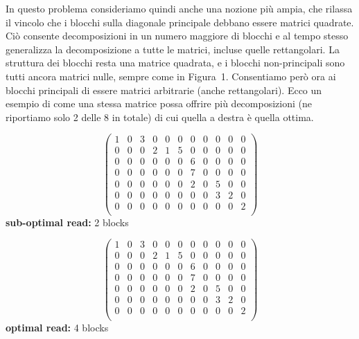 \newpage
{}

In questo problema consideriamo quindi anche una nozione più ampia, che rilassa il vincolo che i blocchi sulla diagonale principale debbano essere matrici quadrate. Ciò consente decomposizioni in un numero maggiore di blocchi e al tempo stesso generalizza la decomposizione a tutte le matrici, incluse quelle rettangolari.
La struttura dei blocchi resta una matrice quadrata, e i blocchi non-principali sono tutti ancora matrici nulle, sempre come in Figura~1. Consentiamo però ora ai blocchi principali di essere matrici arbitrarie (anche rettangolari).
Ecco un esempio di come una stessa matrice possa offrire più decomposizioni (ne riportiamo solo 2 delle 8 in totale) di cui quella a destra è quella ottima.

\begin{table}[!h]
  \begin{minipage}{.5\textwidth}
    \centering
\[
\left(
\begin{array}{cccccc|ccccc}
    1 & 0 & 3  & 0 & 0 & 0   &  0 & 0 & 0 & 0  & 0     \\
    0 & 0 & 0  & 2 & 1 & 5   &  0 & 0 & 0 & 0  & 0     \\   \hline
    0 & 0 & 0  & 0 & 0 & 0   &  6 & 0 & 0 & 0  & 0     \\
    0 & 0 & 0  & 0 & 0 & 0   &  7 & 0 & 0 & 0  & 0     \\
    0 & 0 & 0  & 0 & 0 & 0   &  2 & 0 & 5 & 0  & 0     \\
    0 & 0 & 0  & 0 & 0 & 0   &  0 & 0 & 3 & 2  & 0     \\
    0 & 0 & 0  & 0 & 0 & 0   &  0 & 0 & 0 & 0  & 2     \\
\end{array}\right)
\]
    {\bf sub-optimal read:} 2 blocks
  \end{minipage}%
  \begin{minipage}{.5\textwidth}
    \centering
\[
\left(
\begin{array}{ccc|ccc|cccc|c}
    1 & 0 & 3  & 0 & 0 & 0   &  0 & 0 & 0 & 0  & 0     \\   \hline
    0 & 0 & 0  & 2 & 1 & 5   &  0 & 0 & 0 & 0  & 0     \\   \hline
    0 & 0 & 0  & 0 & 0 & 0   &  6 & 0 & 0 & 0  & 0     \\
    0 & 0 & 0  & 0 & 0 & 0   &  7 & 0 & 0 & 0  & 0     \\
    0 & 0 & 0  & 0 & 0 & 0   &  2 & 0 & 5 & 0  & 0     \\
    0 & 0 & 0  & 0 & 0 & 0   &  0 & 0 & 3 & 2  & 0     \\   \hline
    0 & 0 & 0  & 0 & 0 & 0   &  0 & 0 & 0 & 0  & 2     \\
\end{array}\right)
\]
    {\bf optimal read:} 4 blocks
    \end{minipage}
\end{table}

